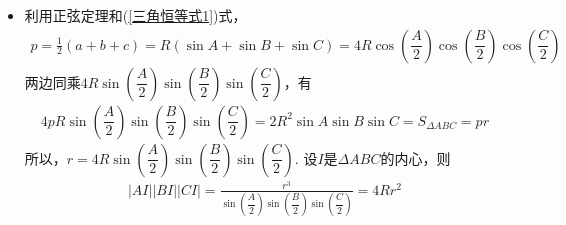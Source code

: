 \begin{itemize}[leftmargin=\inteval{\myitemleftmargin}pt,itemsep=
   \inteval{\myitemitempsep}pt,topsep=\inteval{\myitemtopsep}pt]
\item 利用正弦定理和(\ref{三角恒等式1})式，
\begin{align*}
    p=\frac{1}{2}(a+b+c)=R(\sin A+\sin B+\sin C)=4R\cos(\dfrac{A}{2})
    \cos(\dfrac{B}{2})\cos(\dfrac{C}{2})
\end{align*}
两边同乘$ 4R\sin(\dfrac{A}{2})\sin(\dfrac{B}{2})\sin(\dfrac{C}{2}) $，有
\begin{align*}
    4pR\sin(\dfrac{A}{2})\sin(\dfrac{B}{2})\sin(\dfrac{C}{2})=
    2R^2\sin A\sin B\sin C=S_{\Delta ABC}=pr
\end{align*}
所以，$ r=4R\sin(\dfrac{A}{2})\sin(\dfrac{B}{2})\sin(\dfrac{C}{2}) $.
设$ I $是$ \Delta ABC $的内心，则
\begin{gather*}
    |AI||BI||CI|=\frac{r^3}{\sin(\dfrac{A}{2})\sin(\dfrac{B}{2})
        \sin(\dfrac{C}{2})}=4Rr^2
\end{gather*}


\end{itemize}
